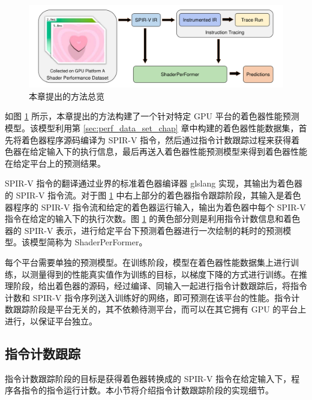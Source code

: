 \begin{figure}[h]
  \centering
  \includegraphics[width=1\linewidth]{figures/OverviewNewNewNew.pdf}
  \caption{本章提出的方法总览}
  \label{fig:pipeline_overview}
\end{figure}

如图 \ref{fig:pipeline_overview} 所示，本{\amend 章}提出的方法构建了一个针对特定 GPU 平台的着色器性能预测模型。{\amend 该模型利用第 \ref{sec:perf_data_set_chap} 章中构建的着色器性能数据集，首先将着色器程序源码编译为 SPIR-V 指令，然后通过指令计数跟踪过程来获得着色器在给定输入下的执行信息，最后再送入着色器性能预测模型来得到着色器性能在给定平台上的预测结果。}

{\amend SPIR-V 指令的翻译}通过业界的标准着色器编译器 glslang \cite{glslang} 实现，{\amend 其输出为着色器的 SPIR-V 指令流。对于图 \ref{fig:pipeline_overview} 中右上部分的着色器指令跟踪阶段，其输入是着色器程序的 SPIR-V 指令流和给定的着色器运行输入，输出为着色器中每个 SPIR-V 指令在给定的输入下的执行次数。图 \ref{fig:pipeline_overview} 的黄色部分则是利用指令计数信息和着色器的 SPIR-V 表示，进行给定平台下预测着色器进行一次绘制的耗时的预测模型。该模型简称为 ShaderPerFormer。}

{\amend 每个平台需要单独的预测模型。在训练阶段，模型在着色器性能数据集上进行训练，以测量得到的性能真实值作为训练的目标，以梯度下降的方式进行训练。在推理阶段，给出着色器的源码，经过编译、同输入一起进行指令计数跟踪后，将指令计数和 SPIR-V 指令序列送入训练好的网络，即可预测在该平台的性能。指令计数跟踪阶段是平台无关的，其不依赖待测平台，而可以在其它拥有 GPU 的平台上进行，以保证平台独立。}

\subsection{指令计数跟踪}

{\amend 指令计数跟踪阶段的目标是获得着色器转换成的 SPIR-V 指令在给定输入下，程序各指令的指令运行计数。本小节将介绍指令计数跟踪阶段的实现细节。}

